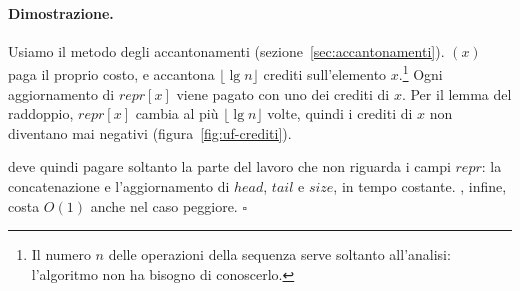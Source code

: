 \paragraph{Dimostrazione.}
Usiamo il metodo degli accantonamenti (sezione~\ref{sec:accantonamenti}). \MakeSet$(x)$ paga il proprio costo, e accantona $\lfloor \lg n \rfloor$ crediti sull'elemento $x$.\footnote{Il numero $n$ delle operazioni \MakeSet{} della sequenza serve soltanto all'analisi: l'algoritmo non ha bisogno di conoscerlo.} Ogni aggiornamento di $\mathit{repr}[x]$ viene pagato con uno dei crediti di $x$. Per il lemma del raddoppio, $\mathit{repr}[x]$ cambia al più $\lfloor \lg n \rfloor$ volte, quindi i crediti di $x$ non diventano mai negativi (figura~\ref{fig:uf-crediti}).

\Union{} deve quindi pagare soltanto la parte del lavoro che non riguarda i campi $\mathit{repr}$: la concatenazione e l'aggiornamento di $\mathit{head}$, $\mathit{tail}$ e $\mathit{size}$, in tempo costante. \FindSet{}, infine, costa $O(1)$ anche nel caso peggiore. \hfill $\square$

